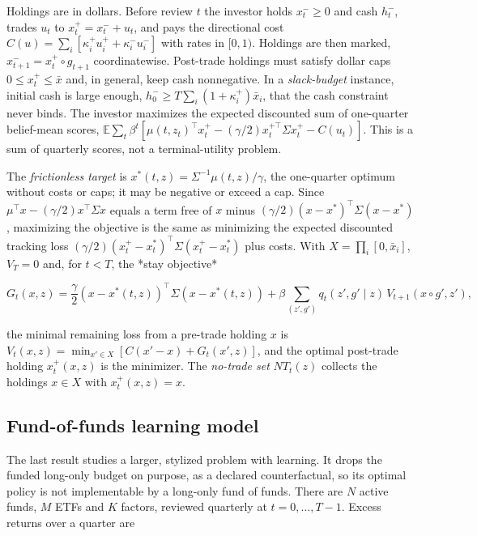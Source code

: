 \documentclass[11pt]{article}
\begin{document}
Holdings are in dollars. Before review \(t\) the investor holds
\(x^-_t\geq0\) and cash \(h^-_t\), trades \(u_t\) to
\(x^+_t=x^-_t+u_t\), and pays the directional cost
\(C(u)=\sum_i[\kappa^+_iu_i^++\kappa^-_iu_i^-]\) with rates in \([0,1)\).
Holdings are then marked, \(x^-_{t+1}=x^+_t\circ g_{t+1}\) coordinatewise.
Post-trade holdings must satisfy dollar caps \(0\leq x^+_t\leq\bar x\)
and, in general, keep cash nonnegative. In a \emph{slack-budget} instance,
initial cash is large enough, \(h^-_0\geq T\sum_i(1+\kappa^+_i)\bar x_i\),
that the cash constraint never binds. The investor maximizes the
expected discounted sum of one-quarter belief-mean scores,
\(\mathbb E\sum_t\beta^t[\mu(t,z_t)^\top x^+_t-(\gamma/2)x^{+\top}_t\Sigma
x^+_t-C(u_t)]\). This is a sum of quarterly scores, not a
terminal-utility problem.

The \emph{frictionless target} is \(x^*(t,z)=\Sigma^{-1}\mu(t,z)/\gamma\), the
one-quarter optimum without costs or caps; it may be negative or
exceed a cap. Since
\(\mu^\top x-(\gamma/2)x^\top\Sigma x\) equals a term free of \(x\) minus
\((\gamma/2)(x-x^*)^\top\Sigma(x-x^*)\), maximizing the objective is the
same as minimizing the expected discounted tracking loss
\((\gamma/2)(x^+_t-x^*_t)^\top\Sigma(x^+_t-x^*_t)\) plus costs. With
\(X=\prod_i[0,\bar x_i]\), \(V_T=0\) and, for \(t<T\), the *stay
objective*

\begin{equation*}
G_t(x,z)=\frac\gamma2(x-x^*(t,z))^\top\Sigma(x-x^*(t,z))
 +\beta\sum_{(z',g')}q_t(z',g'\mid z)\,V_{t+1}(x\circ g',z'),
\end{equation*}

the minimal remaining loss from a pre-trade holding \(x\) is
\(V_t(x,z)=\min_{x'\in X}[C(x'-x)+G_t(x',z)]\), and the optimal
post-trade holding \(x^+_t(x,z)\) is the minimizer. The \emph{no-trade set}
\(NT_t(z)\) collects the holdings \(x\in X\) with \(x^+_t(x,z)=x\).

\subsection*{Fund-of-funds learning model}

The last result studies a larger, stylized problem with learning. It
drops the funded long-only budget on purpose, as a declared
counterfactual, so its optimal policy is not implementable by a
long-only fund of funds. There are \(N\) active funds, \(M\) ETFs and
\(K\) factors, reviewed quarterly at \(t=0,\ldots,T-1\). Excess returns
over a quarter are
\end{document}
